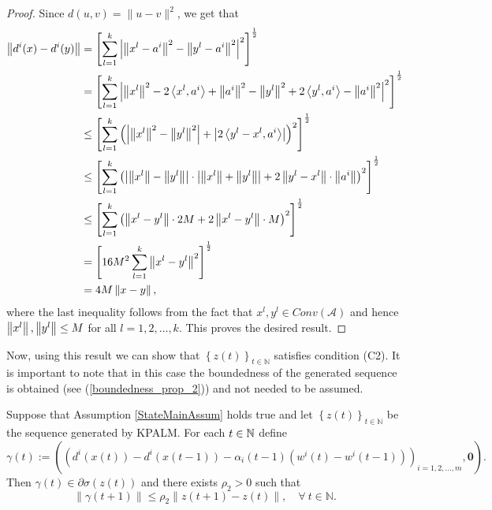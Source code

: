 \begin{proof}
Since $d(u,v) = \| u-v \|^2$, we get that
\begin{align*} 
	\left\Vert {d^i(x)  - d^i(y)} \right\Vert 
	&= \left[ \sum\limits_{l=1}^{k} \left\lvert \left\Vert {x^l - a^i} \right\Vert^2 - \left\Vert { y^l -a^i} \right\Vert^2 \right\rvert^2 \right]^{\frac{1}{2}} \\
	&= \left[ \sum\limits_{l=1}^{k} \left\lvert \left\Vert {x^l} \right\Vert^2 - 2\left\langle x^l,a^i \right\rangle + \left\Vert {a^i} \right\Vert^2 - \left\Vert {y^l} \right\Vert^2 + 2\left\langle y^l,a^i \right\rangle - \left\Vert {a^i} \right\Vert^2 \right\rvert ^2 \right]^{\frac{1}{2}} \\ 
	&\leq \left[ \sum\limits_{l=1}^{k} \left( \left\lvert \left\Vert {x^l} \right\Vert^2 - \left\Vert {y^l} \right\Vert^2 \right\rvert + \left\lvert 2\left\langle y^l - x^l , a^i \right\rangle \right\rvert \right)^2 \right]^{\frac{1}{2}} \\ 
	&\leq \left[ \sum\limits_{l=1}^{k} \left( \left\lvert \left\Vert {x^l} \right\Vert - \left\Vert {y^l} \right\Vert \right\rvert \cdot \left\lvert \left\Vert {x^l} \right\Vert + \left\Vert {y^l} \right\Vert \right\rvert + 2 \left\Vert {y^l - x^l} \right\Vert \cdot \left\Vert {a^i} \right\Vert \right)^2 \right]^{\frac{1}{2}} \\
	&\leq \left[ \sum\limits_{l=1}^{k} \left( \left\Vert {x^l - y^l} \right\Vert \cdot 2M + 2 \left\Vert {x^l - y^l} \right\Vert\cdot M \right)^2 \right]^{\frac{1}{2}} \\
	&= \left[ 16M^2 \sum\limits_{l=1}^{k} \left\Vert {x^l - y^l} \right\Vert^2 \right]^{\frac{1}{2}} \\
	&= 4M \left\Vert {x - y} \right\Vert ,
\end{align*}
where the last inequality follows from the fact that $x^l,y^l \in Conv(\mathcal{A})$ and hence $\left\Vert {x^l} \right\Vert,\left\Vert {y^l} \right\Vert \leq M$ for all $l=1,2,\ldots,k$. This proves the desired result.
\end{proof}

Now, using this result we can show that $\left\lbrace z(t) \right\rbrace_{t \in \mathbb{N}}$ satisfies condition (C2). It is important to note that in this case the boundedness of the generated sequence is obtained (see (\ref{boundedness_prop_2})) and not needed to be assumed.

\begin{proposition} \label{State_KPALM_SGP}
Suppose that Assumption \ref{StateMainAssum} holds true and let $\left\lbrace z(t) \right\rbrace_{t \in \mathbb{N}}$ be the sequence generated by KPALM.
For each $t \in \mathbb{N}$ define 
\begin{equation*}
	\gamma(t) := \left( \left( d^i(x(t)) - d^i(x(t-1)) - \alpha_i(t-1)(w^i(t) - w^i(t-1)) \right)_{i=1,2, \ldots, m}, \mathbf{0} \right).
\end{equation*}
Then $\gamma(t) \in \partial \sigma(z(t))$ and there exists $\rho_2 > 0$ such that 
\begin{equation*}
	\| \gamma(t+1)\| \leq \rho_2 \|z(t+1) - z(t)\|, \quad \forall \: t \in \mathbb{N} .
\end{equation*}
\end{proposition}

